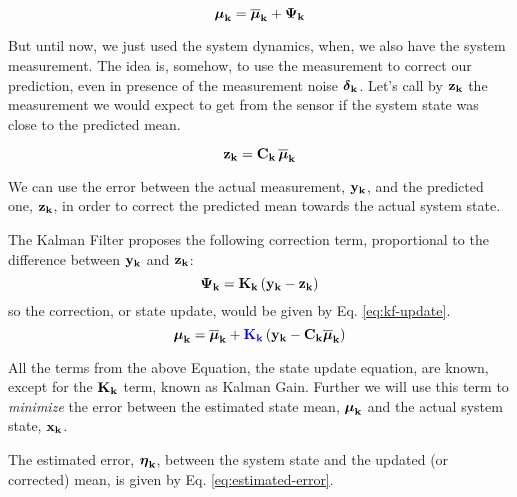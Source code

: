 \documentclass[12pt]{article}
\begin{document}
\begin{equation}
    {\boldsymbol{\mu}}_\mathbf{k} = {\boldsymbol{\overline{\mu}}}_\mathbf{k} + \boldsymbol{\mathbf{\Psi_k}}
\end{equation}

But until now, we just used the system dynamics, when, we also have the system measurement. The idea is, somehow, to use the measurement to correct our prediction, even in presence of the measurement noise ${\boldsymbol{\delta}}_\mathbf{k}$. Let's call by $\boldsymbol{\mathbf{z_k}}$ the measurement we would expect to get from the sensor if the system state was close to the predicted mean.

\begin{equation}
    \boldsymbol{\mathbf{z_k}} = \boldsymbol{\mathbf{C_k}}\, {\boldsymbol{\overline{\mu}}}_\mathbf{k}
\end{equation}

We can use the error between the actual measurement, $\boldsymbol{\mathbf{y_k}}$, and the predicted one, $\boldsymbol{\mathbf{z_k}}$, in order to correct the predicted mean towards the actual system state. 

The Kalman Filter proposes the following correction term, proportional to the difference between $\boldsymbol{\mathbf{y_k}}$ and $\boldsymbol{\mathbf{z_k}}$:
\begin{equation}
    \boldsymbol{\mathbf{\Psi_k}} = \boldsymbol{\mathbf{K_k}}\left(\boldsymbol{\mathbf{y_k}} - \boldsymbol{\mathbf{z_k}}\right)
    \label{eq:kalman-correction-term}
\end{equation}
so the correction, or state update, would be given by Eq. \ref{eq:kf-update}.
\begin{equation}
    {\boldsymbol{\mu}}_\mathbf{k} = {\boldsymbol{\overline{\mu}}}_\mathbf{k} + \color{blue}\boldsymbol{\mathbf{K_k}}\color{black}\left(\boldsymbol{\mathbf{y_k}} - \boldsymbol{\mathbf{C_k}}{\boldsymbol{\overline{\mu}}}_\mathbf{k}\right)
    \label{eq:kf-update}
\end{equation}

All the terms from the above Equation, the state update equation, are known, except for the $\boldsymbol{\mathbf{K_k}}$ term, known as Kalman Gain. Further we will use this term to \emph{minimize} the error between the estimated state mean, ${\boldsymbol{\mu}}_\mathbf{k}$ and the actual system state, $\boldsymbol{\mathbf{x_k}}$.

The estimated error, ${\boldsymbol{\eta}}_\mathbf{k}$, between the system state and the updated (or corrected) mean, is given by Eq. \ref{eq:estimated-error}.
\end{document}
